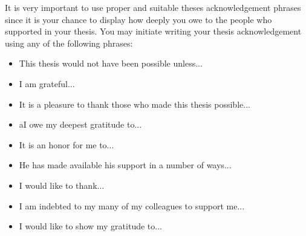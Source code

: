 \begin{acknowledgements}
It is very important to use proper and suitable theses acknowledgement 
phrases since it is your chance to display how deeply you owe to the 
people who supported in your thesis.  You may initiate writing your 
thesis acknowledgement using any of the following phrases:\\

  \begin{itemize}
  \item This thesis would not have been possible unless...
  \item I am grateful...
  \item It is a pleasure to thank those who made this thesis possible...
  \item aI owe my deepest gratitude to...
  \item It is an honor for me to...
  \item He has made available his support in a number of ways...
  \item I would like to thank...
  \item I am indebted to my many of my colleagues to support me...
  \item I would like to show my gratitude to...
  \end{itemize}

\end{acknowledgements}


